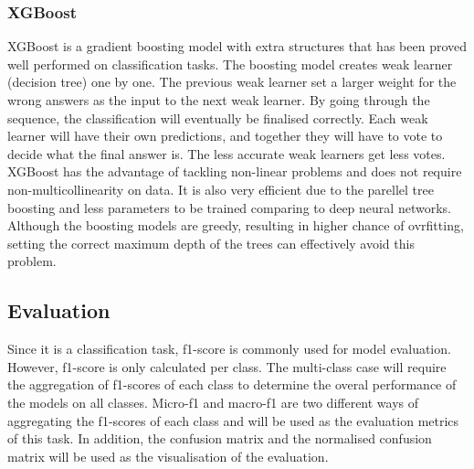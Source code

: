 \documentclass[10pt, a4paper, twocolumn]{article} %
\begin{document}
\subsubsection{XGBoost}
XGBoost\citep{Rohan}\citep{ODSC} is a gradient boosting model with extra structures that has been proved well performed on classification tasks. 
The boosting model creates weak learner (decision tree) one by one. The previous weak learner set a larger weight for the wrong answers 
as the input to the next weak learner. By going through the sequence, the classification will eventually be finalised correctly. 
Each weak learner will have their own predictions, and together they will have to vote to decide what the final answer is. The less 
accurate weak learners get less votes.\\[10pt]
XGBoost has the advantage of tackling non-linear problems and does not require non-multicollinearity on data. It is also very efficient 
due to the parellel tree boosting and less parameters to be trained comparing to deep neural networks. Although the boosting models are 
greedy, resulting in higher chance of ovrfitting, setting the correct maximum depth of the trees can effectively avoid this problem.
\subsection{Evaluation}
Since it is a classification task, f1-score\citep{Kenneth} is commonly used for model evaluation. However, f1-score is only calculated per class. 
The multi-class case will require the aggregation of f1-scores of each class to determine the overal performance of the models on 
all classes. Micro-f1 and macro-f1 are two different ways of aggregating the f1-scores of each class and will be used as the 
evaluation metrics of this task. In addition, the confusion matrix and the normalised confusion matrix will be used as the visualisation 
of the evaluation.
\end{document}

